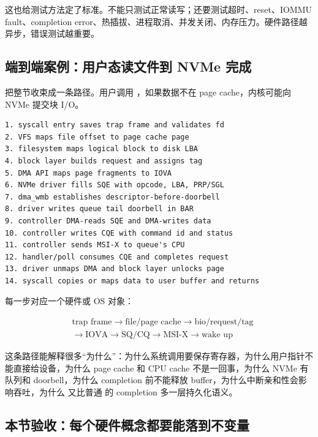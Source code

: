 这也给测试方法定了标准。不能只测试正常读写；还要测试超时、reset、IOMMU fault、completion error、热插拔、进程取消、并发关闭、内存压力。硬件路径越异步，错误测试越重要。

\subsection{端到端案例：用户态读文件到 NVMe 完成}

把整节收束成一条路径。用户调用 ，如果数据不在 page cache，内核可能向 NVMe 提交块 I/O。

\begin{lstlisting}
1. syscall entry saves trap frame and validates fd
2. VFS maps file offset to page cache page
3. filesystem maps logical block to disk LBA
4. block layer builds request and assigns tag
5. DMA API maps page fragments to IOVA
6. NVMe driver fills SQE with opcode, LBA, PRP/SGL
7. dma_wmb establishes descriptor-before-doorbell
8. driver writes queue tail doorbell in BAR
9. controller DMA-reads SQE and DMA-writes data
10. controller writes CQE with command id and status
11. controller sends MSI-X to queue's CPU
12. handler/poll consumes CQE and completes request
13. driver unmaps DMA and block layer unlocks page
14. syscall copies or maps data to user buffer and returns
\end{lstlisting}

每一步对应一个硬件或 OS 对象：

\[
\begin{aligned}
&\text{trap frame}
\rightarrow \text{file/page cache}
\rightarrow \text{bio/request/tag}\\
&\rightarrow \text{IOVA}
\rightarrow \text{SQ/CQ}
\rightarrow \text{MSI-X}
\rightarrow \text{wake up}
\end{aligned}
\]

这条路径能解释很多“为什么”：为什么系统调用要保存寄存器，为什么用户指针不能直接给设备，为什么 page cache 和 CPU cache 不是一回事，为什么 NVMe 有队列和 doorbell，为什么 completion 前不能释放 buffer，为什么中断亲和性会影响吞吐，为什么  又比普通  的 completion 多一层持久化语义。

\subsection{本节验收：每个硬件概念都要能落到不变量}

